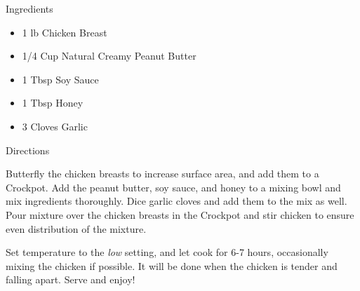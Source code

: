Ingredients
\begin{itemize}
	\item 1 lb Chicken Breast
	\item 1/4 Cup Natural Creamy Peanut Butter
	\item 1 Tbsp Soy Sauce
	\item 1 Tbsp Honey
	\item 3 Cloves Garlic
\end{itemize}

\noindent
Directions
\newline

Butterfly the chicken breasts to increase surface area, and add them to a Crockpot. Add the peanut butter, soy sauce, and honey to a mixing bowl and mix ingredients thoroughly. Dice garlic cloves and add them to the mix as well. Pour mixture over the chicken breasts in the Crockpot and stir chicken to ensure even distribution of the mixture.

Set temperature to the \textit{low} setting, and let cook for 6-7 hours, occasionally mixing the chicken if possible. It will be done when the chicken is tender and falling apart. Serve and enjoy!